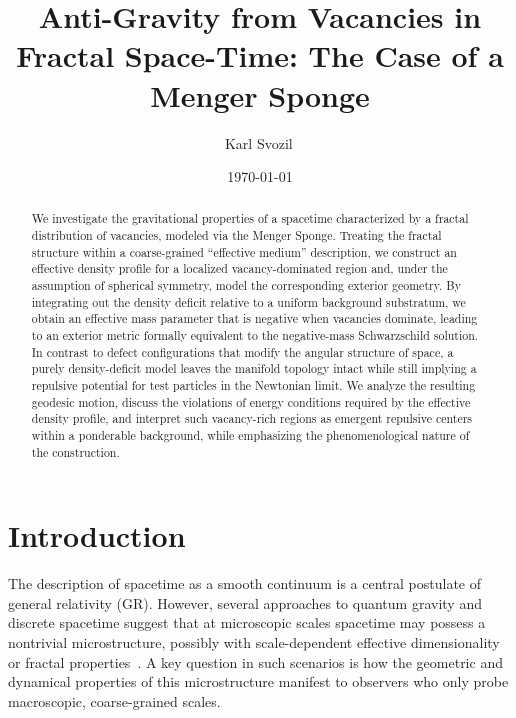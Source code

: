 \documentclass[%
  reprint,
  superscriptaddress,
  showpacs,
  showkeys,
  amsmath,amssymb,
  pra,
  longbibliography,
  floatfix,
  x11names
]{revtex4-2}
\begin{document}
\title{Anti-Gravity from Vacancies in Fractal Space-Time: The Case of a Menger Sponge}

\author{Karl Svozil\,}

\date{\today}

\begin{abstract}
We investigate the gravitational properties of a spacetime characterized by a fractal distribution of vacancies, modeled via the Menger Sponge. Treating the fractal structure within a coarse-grained ``effective medium'' description, we construct an effective density profile for a localized vacancy-dominated region and, under the assumption of spherical symmetry, model the corresponding exterior geometry. By integrating out the density deficit relative to a uniform background substratum, we obtain an effective mass parameter that is negative when vacancies dominate, leading to an exterior metric formally equivalent to the negative-mass Schwarzschild solution. In contrast to defect configurations that modify the angular structure of space, a purely density-deficit model leaves the manifold topology intact while still implying a repulsive potential for test particles in the Newtonian limit. We analyze the resulting geodesic motion, discuss the violations of energy conditions required by the effective density profile, and interpret such vacancy-rich regions as emergent repulsive centers within a ponderable background, while emphasizing the phenomenological nature of the construction.
\end{abstract}


\maketitle

\section{Introduction}
\label{sec:intro}

The description of spacetime as a smooth continuum is a central postulate of general relativity (GR). However, several approaches to quantum gravity and discrete spacetime suggest that at microscopic scales spacetime may possess a nontrivial microstructure, possibly with scale-dependent effective dimensionality or fractal properties~\cite{Ambjorn2012_review,barkley-2019}. A key question in such scenarios is how the geometric and dynamical properties of this microstructure manifest to observers who only probe macroscopic, coarse-grained scales.
\end{document}

